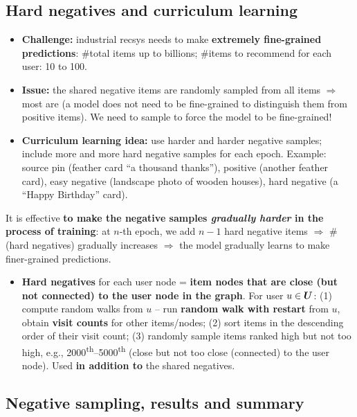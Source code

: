 \subsection{Hard negatives and curriculum learning}\label{sec:lec11-hard}

\begin{itemize}
  \item \textbf{Challenge:} industrial recsys needs to make \textbf{extremely
    fine-grained predictions}: \#total items up to billions; \#items to
    recommend for each user: 10 to 100.
  \item \textbf{Issue:} the shared negative items are randomly sampled from all
    items $\Rightarrow$ most are  (a model does not need
    to be fine-grained to distinguish them from positive items). We need to
    sample  to force the model to be fine-grained!
  \item \textbf{Curriculum learning idea:} use harder and harder negative
    samples; include more and more hard negative samples for each epoch.
    Example: source pin (feather card ``a thousand thanks''), positive (another
    feather card), easy negative (landscape photo of wooden houses), hard
    negative (a ``Happy Birthday'' card).
\end{itemize}
\begin{keyidea}
  It is effective \textbf{to make the negative samples \emph{gradually harder}
  in the process of training}: at $n$-th epoch, we add $n-1$ hard negative
  items $\Rightarrow$ \#(hard negatives) gradually increases $\Rightarrow$ the
  model gradually learns to make finer-grained predictions.
\end{keyidea}
\begin{itemize}
  \item \textbf{Hard negatives} for each user node = \textbf{item nodes that
    are close (but not connected) to the user node in the graph}. For user
    $u\in\bm{U}$: (1) compute random walks from $u$ -- run \textbf{random walk
    with restart} from $u$, obtain \textbf{visit counts} for other
    items/nodes; (2) sort items in the descending order of their visit count;
    (3) randomly sample items ranked high but not too high, e.g.,
    2000\textsuperscript{th}--5000\textsuperscript{th} (close but not too close
    (connected) to the user node). Used \textbf{in addition to} the shared
    negatives.
\end{itemize}

\subsection{Negative sampling, results and summary}\label{sec:lec11-pin-results}

